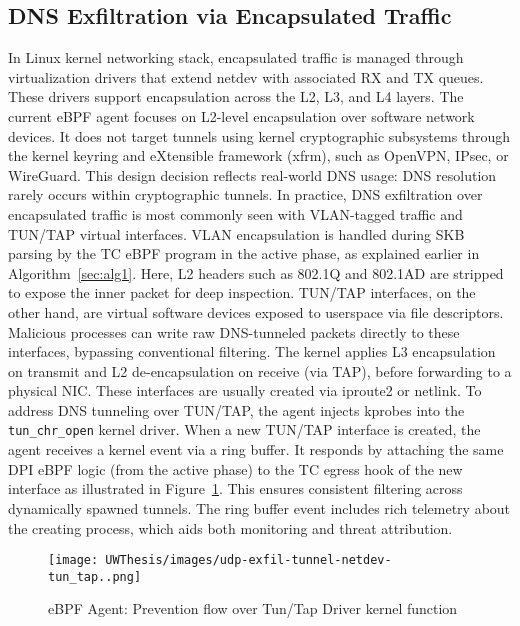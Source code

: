 \documentclass [11pt, proquest] {uwthesis}[2020/02/24]
\begin{document}
\subsection{DNS Exfiltration via Encapsulated Traffic}
\label{sec:encap}
In Linux kernel networking stack, encapsulated traffic is managed through virtualization drivers that extend netdev with associated RX and TX queues. These drivers support encapsulation across the L2, L3, and L4 layers. The current eBPF agent focuses on L2-level encapsulation over software network devices. It does not target tunnels using kernel cryptographic subsystems through the kernel keyring and eXtensible framework (xfrm), such as OpenVPN, IPsec, or WireGuard. This design decision reflects real-world DNS usage: DNS resolution rarely occurs within cryptographic tunnels. In practice, DNS exfiltration over encapsulated traffic is most commonly seen with VLAN-tagged traffic and TUN/TAP virtual interfaces. VLAN encapsulation is handled during SKB parsing by the TC eBPF program in the active phase, as explained earlier in Algorithm~\ref{sec:alg1}. Here, L2 headers such as 802.1Q and 802.1AD are stripped to expose the inner packet for deep inspection. TUN/TAP interfaces, on the other hand, are virtual software devices exposed to userspace via file descriptors. Malicious processes can write raw DNS-tunneled packets directly to these interfaces, bypassing conventional filtering. The kernel applies L3 encapsulation on transmit and L2 de-encapsulation on receive (via TAP), before forwarding to a physical NIC. These interfaces are usually created via iproute2 or netlink. To address DNS tunneling over TUN/TAP, the agent injects kprobes into the \texttt{tun\_chr\_open} kernel driver. When a new TUN/TAP interface is created, the agent receives a kernel event via a ring buffer. It responds by attaching the same DPI eBPF logic (from the active phase) to the TC egress hook of the new interface as illustrated in Figure~\ref{sec:data_plane_tunnel_netdev}. This ensures consistent filtering across dynamically spawned tunnels. The ring buffer event includes rich telemetry about the creating process, which aids both monitoring and threat attribution.


\begin{figure}[htbp]
\centering
\texttt{[image: UWThesis/images/udp-exfil-tunnel-netdev-tun\_tap..png]}
\caption{eBPF Agent: Prevention flow over Tun/Tap Driver kernel function}
\label{sec:data_plane_tunnel_netdev}
\end{figure}
\end{document}
